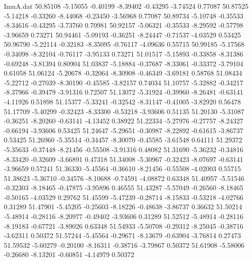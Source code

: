 \begin{filecontents}{ImuA.dat}
  50.85108   -5.15055   -0.40199   -8.39402   -0.43295   -3.74524    0.77087
  50.87525   -5.14218   -0.33260   -8.44068   -0.23450   -3.56968    0.77087
  50.89734   -5.10748   -0.35533   -8.34616   -0.43295   -3.73760    0.70981
  50.92157   -5.06321   -0.35533   -8.29592   -0.57798   -3.96659    0.73271
  50.94461   -5.09193   -0.36251   -8.24447   -0.71537   -4.03529    0.53425
  50.96790   -5.22114   -0.32183   -8.35095   -0.76117   -4.09636    0.55715
  50.99185   -5.17568   -0.34098   -8.32104   -0.76117   -3.95133    0.73271
  51.01517   -5.15893   -0.33858   -8.31386   -0.69248   -3.81394    0.80904
  51.03837   -5.18884   -0.37687   -8.33061   -0.33372   -3.79104    0.61058
  51.06124   -5.20678   -0.32064   -8.30908   -0.46349   -3.69181    0.58768
  51.08434   -5.22712   -0.27039   -8.30190   -0.45585   -3.82157    0.74034
  51.10757   -5.32882   -0.34217   -8.37966   -0.39479   -3.91316    0.72507
  51.13072   -5.31924   -0.39960   -8.26481   -0.63141   -4.11926    0.51898
  51.15377   -5.33241   -0.32542   -8.31147   -0.41005   -3.82920    0.56478
  51.17709   -5.40299   -0.32423   -8.33300   -0.53218   -3.93606    0.51135
  51.20130   -5.31087   -0.36251   -8.20260   -0.63141   -4.13452    0.38922
  51.22334   -5.27976   -0.27757   -8.24327   -0.66194   -3.93606    0.53425
  51.24647   -5.29651   -0.30987   -8.22892   -0.61615   -3.86737    0.53425
  51.26960   -5.35514   -0.34457   -8.30070   -0.45585   -3.61548    0.64111
  51.29372   -5.35633   -0.37448   -8.21456   -0.55508   -3.91316    0.48082
  51.31690   -5.36232   -0.34816   -8.33420   -0.32609   -3.66891    0.47318
  51.34008   -5.30967   -0.32423   -8.07697   -0.63141   -3.96659    0.57241
  51.36330   -5.45564   -0.36610   -8.21456   -0.55508   -4.02003    0.55715
  51.38623   -5.36710   -0.34576   -8.10688   -0.74591   -4.08872    0.63348
  51.40957   -5.51546   -0.32303   -8.18465   -0.47875   -3.95896    0.46555
  51.43287   -5.57049   -0.26560   -8.18465   -0.50165   -4.03529    0.29762
  51.45599   -5.47239   -0.28714   -8.15833   -0.53218   -4.02766    0.31289
  51.47901   -5.45205   -0.25603   -8.18226   -0.48638   -3.86737    0.36632
  51.50214   -5.48914   -0.28116   -8.20977   -0.49402   -3.93606    0.31289
  51.52512   -5.48914   -0.28116   -8.19183   -0.67721   -3.89026    0.63348
  51.54933   -5.50708   -0.29312   -8.25045   -0.38716   -3.62311    0.50372
  51.57244   -5.45564   -0.29671   -8.13679   -0.63904   -3.76814    0.27473
  51.59532   -5.60279   -0.20100   -8.16311   -0.38716   -3.79867    0.50372
  51.61908   -5.58006   -0.26680   -8.13201   -0.60851   -4.14979    0.50372

\end{filecontents}
